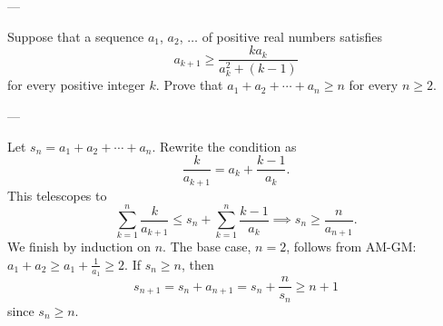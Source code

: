 
---

Suppose that a sequence $a_1$, $a_2$, $\ldots$ of positive real numbers satisfies \[a_{k+1}\ge\frac{ka_k}{a_k^2+(k-1)}\]
for every positive integer $k$. Prove that $a_1+a_2+\cdots+a_n\ge n$ for every $n\ge2$.

---

Let $s_n=a_1+a_2+\cdots+a_n$. Rewrite the condition as \[\frac k{a_{k+1}}=a_k+\frac{k-1}{a_k}.\]
This telescopes to \[\sum_{k=1}^n\frac k{a_{k+1}}\le s_n+\sum_{k=1}^n\frac{k-1}{a_k}\implies s_n\ge\frac n{a_{n+1}}.\]
We finish by induction on $n$. The base case, $n=2$, follows from AM-GM: $a_1+a_2\ge a_1+\tfrac1{a_1}\ge2$. If $s_n\ge n$, then \[s_{n+1}=s_n+a_{n+1}=s_n+\frac n{s_n}\ge n+1\]
since $s_n\ge n$.

